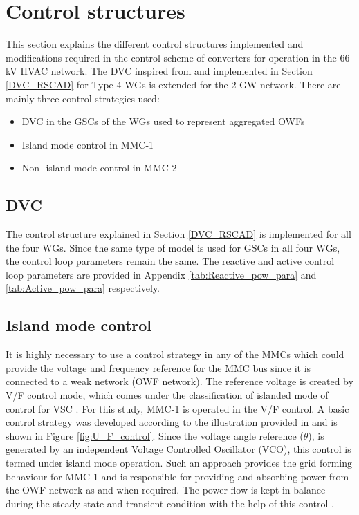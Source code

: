 \section{Control structures}\label{control_structures}
This section explains the different control structures implemented and modifications required in the control scheme of converters for operation in the 66 kV \gls{HVAC} network. The \gls{DVC} inspired from \cite{erlich_new_2017} and implemented in Section \ref{DVC_RSCAD} for Type-4 \gls{WG}s is extended for the 2 GW network. There are mainly three control strategies used:
\begin{itemize}
    \item \gls{DVC} in the \gls{GSC}s of the \gls{WG}s used to represent aggregated \gls{OWF}s 
    \item Island mode control in \gls{MMC}-1
    \item Non- island mode control in \gls{MMC}-2
\end{itemize}

\subsection{DVC}
The control structure explained in Section \ref{DVC_RSCAD} is implemented for all the four \gls{WG}s. Since the same type of model is used for \gls{GSC}s in all four \gls{WG}s, the control loop parameters remain the same. The reactive and active control loop parameters are provided in Appendix \ref{tab:Reactive_pow_para} and \ref{tab:Active_pow_para} respectively.

\subsection{Island mode control}
It is highly necessary to use a control strategy in any of the \gls{MMC}s which could provide the voltage and frequency reference for the \gls{MMC} bus since it is connected to a weak network (\gls{OWF} network). The reference voltage is created by V/F control mode, which comes under the classification of islanded mode of control for \gls{VSC} \cite{vrana2013cigre}. For this study, \gls{MMC}-1 is operated in the V/F control. A basic control strategy was developed according to the illustration provided in \cite{wachal2014guide} and is shown in Figure \ref{fig:U_F_control}. Since the voltage angle reference ($\theta$), is generated by an independent Voltage Controlled Oscillator (VCO), this control is termed under island mode operation. Such an approach provides the grid forming behaviour for \gls{MMC}-1 and is responsible for providing and absorbing power from the \gls{OWF} network as and when required. The power flow is kept in balance during the steady-state and transient condition with the help of this control \cite{cigre_B455}.  

